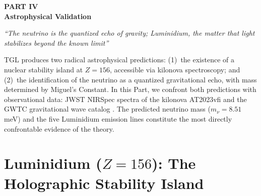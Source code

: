 \documentclass[12pt,a4paper,twoside]{article}
\begin{document}

\setcounter{section}{0}
\renewcommand{\thesection}{IV.\arabic{section}}
\renewcommand{\theequation}{IV.\arabic{equation}}
\renewcommand{\theHsection}{IV.\arabic{section}}
\setcounter{footnote}{0}

\begin{center}
\vspace*{1cm}
{\huge\bfseries\color{tglblue} PART IV}\\[0.5cm]
{\LARGE\bfseries\color{tglblue} Astrophysical Validation}\\[0.3cm]
\vspace*{1cm}

{\large\itshape ``The neutrino is the quantized echo of gravity; Luminidium, the matter that light stabilizes beyond the known limit''}\\[0.3cm]
\vspace*{1.5cm}
\end{center}

\noindent TGL produces two radical astrophysical predictions: (1)~the existence of a nuclear stability island at $Z = 156$, accessible via kilonova spectroscopy; and (2)~the identification of the neutrino as a quantized gravitational echo, with mass determined by Miguel's Constant. In this Part, we confront both predictions with observational data: JWST NIRSpec spectra of the kilonova AT2023vfi \cite{Gillanders2025} and the GWTC gravitational wave catalog \cite{GWTC3}. The predicted neutrino mass ($m_\nu = 8.51$ meV) and the five Luminidium emission lines constitute the most directly confrontable evidence of the theory.




\section{Luminidium ($Z = 156$): The Holographic Stability Island}
\end{document}

